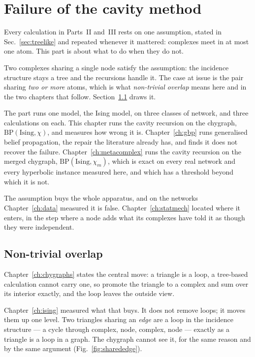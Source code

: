 \chapter{Failure of the cavity method}
\label{ch:overlap}

Every calculation in Parts~II and~III rests on one assumption, stated in
Sec.~\ref{sec:treelike} and repeated whenever it mattered: complexes meet in at
most one atom. This part is about what to do when they do not.

Two complexes sharing a single node satisfy the assumption: the incidence
structure stays a tree and the recursions handle it. The case at issue is the
pair sharing \emph{two or more} atoms, which is what \emph{non-trivial overlap}
means here and in the two chapters that follow. Section~\ref{sec:price} draws
it.

The part runs one model, the Ising model, on three classes of network, and three
calculations on each. This chapter runs the cavity recursion on the chygraph,
$\mathrm{BP}(\mathrm{Ising},\chi)$, and measures how wrong it is.
Chapter~\ref{ch:gbp} runs generalised belief propagation, the repair the
literature already has, and finds it does not recover the failure.
Chapter~\ref{ch:metacomplex} runs the cavity recursion on the merged chygraph,
$\mathrm{BP}(\mathrm{Ising},\chi_{m})$, which is exact on every real network and every
hyperbolic instance measured here, and which has a threshold beyond which it is
not.

The assumption buys the whole apparatus, and on the networks
Chapter~\ref{ch:data} measured it is false.
Chapter~\ref{ch:statmech} located where it enters, in the step where a node adds
what its complexes have told it as though they were independent.

\section{Non-trivial overlap}
\label{sec:price}

Chapter~\ref{ch:chygraphs} states the central move: a triangle is a loop, a
tree-based calculation cannot carry one, so promote the triangle to a complex
and sum over its interior exactly, and the loop leaves the outside view.

Chapter~\ref{ch:ising} measured what that buys. It does not remove loops; it
moves them up one level. Two triangles sharing an
\emph{edge} are a loop in the incidence structure --- a cycle through complex,
node, complex, node --- exactly as a triangle is a loop in a graph. The chygraph
cannot see it, for the same reason and by the same argument
(Fig.~\ref{fig:sharededge}).

